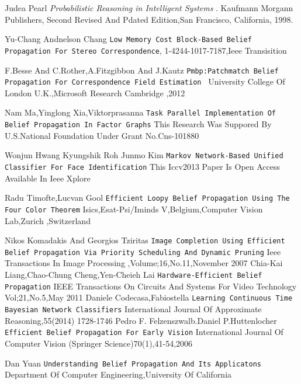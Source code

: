 \documentclass{raitdisser}
\begin{document}
\begin{thebibliography}{9}
Judea Pearl
\textit{Probabilistic Reasoning in Intelligent Systems }.
Kaufmann Morgann Publishers, Second Revised And Pdated Edition,San Francisco, California, 1998.

Yu-Chang Andnelson Chang
\texttt{Low Memory Cost Block-Based Belief Propagation For Stereo Correspondence},
1-4244-1017-7187,Ieee Transisition

F.Besse And C.Rother,A.Fitzgibbon And J.Kautz
\texttt{Pmbp:Patchmatch Belief Propagation For Correspondence Field Estimation }
University  College Of London U.K.,Microsoft Research Cambridge ,2012


Nam Ma,Yinglong Xia,Viktorprasanna
\texttt{Task Parallel Implementation Of Belief Propagation In Factor Graphs}
This Research Was Suppored By U.S.National Foundation Under Grant No.Cns-101880

Wonjun Hwang Kyungshik Roh Junmo Kim
\texttt{Markov Network-Based Unified Classifier For Face Identification}
This Iccv2013 Paper Is Open Access Available In Ieee Xplore

Radu Timofte,Lucvan Gool
\texttt{Efficient Loopy Belief Propagation Using The Four Color Theorem}
Isics,Esat-Psi/Iminds V,Belgium,Computer Vision Lab,Zurich ,Switzerland

Nikos Komadakis And Georgios Tziritas
\texttt{Image Completion Using Efficient Belief Propagation Via Priority Scheduling And Dynamic Pruning}
Ieee Transactions In Image Processing ,Volume;16,No.11,November 2007
Chia-Kai Liang,Chao-Chung Cheng,Yen-Cheieh Lai
\texttt{Hardware-Efficient Belief Propagation}
IEEE Transactions On Circuits And Systems For Video Technology Vol;21,No.5,May 2011
Daniele Codecasa,Fabiostella
\texttt{Learning Continuous Time Bayesian Network Classifiers}
International Journal Of Approximate Reasoning,55(2014) 1728-1746
Pedro F. Felzenszwalb.Daniel P.Huttenlocher
\texttt{Efficient Belief Propagation For Early Vision}
International Journal Of Computer Vision (Springer Science)70(1),41-54,2006

Dan Yuan
\texttt{Understanding Belief Propagation And Its Applicatons}
Department Of Computer Engineering,University Of California


\end{thebibliography}
\end{document}
